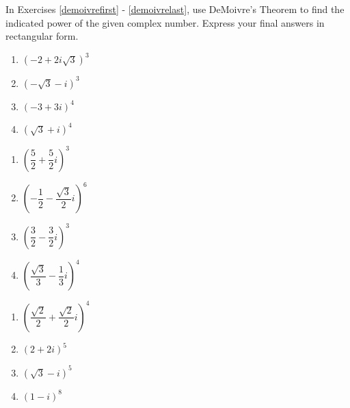 In Exercises \ref{demoivrefirst} - \ref{demoivrelast}, use DeMoivre's Theorem to find the indicated power of the given complex number.  Express your final answers in rectangular form.

\begin{multicols}{4}

\begin{enumerate}

\setcounter{enumi}{\value{HW}}

\item $\left(-2 + 2i\sqrt{3}\right)^3$ \label{demoivrefirst}
\item $(-\sqrt{3} - i)^3$ 
\item $(-3+3i)^{4}$
\item $(\sqrt{3} + i)^4$

\setcounter{HW}{\value{enumi}}

\end{enumerate}

\end{multicols}

\begin{multicols}{4} 

\begin{enumerate}

\setcounter{enumi}{\value{HW}}

\item $\left(\dfrac{5}{2} + \dfrac{5}{2} i\right)^3$ 
\item $\left(-\dfrac{1}{2} - \dfrac{\sqrt{3}}{2} i\right)^{6}$
\item $\left(\dfrac{3}{2} - \dfrac{3}{2} i\right)^3$ 
\item $\left(\dfrac{\sqrt{3}}{3} - \dfrac{1}{3} i\right)^4$

\setcounter{HW}{\value{enumi}}

\end{enumerate}

\end{multicols}

\begin{multicols}{4} 

\begin{enumerate}

\setcounter{enumi}{\value{HW}}

\item $\left(\dfrac{\sqrt{2}}{2} + \dfrac{\sqrt{2}}{2} i\right)^4$
\item $(2+2i)^5$ 
\item $(\sqrt{3} - i)^{5}$ 
\item $(1-i)^8$  \label{demoivrelast}

\setcounter{HW}{\value{enumi}}

\end{enumerate}

\end{multicols}

